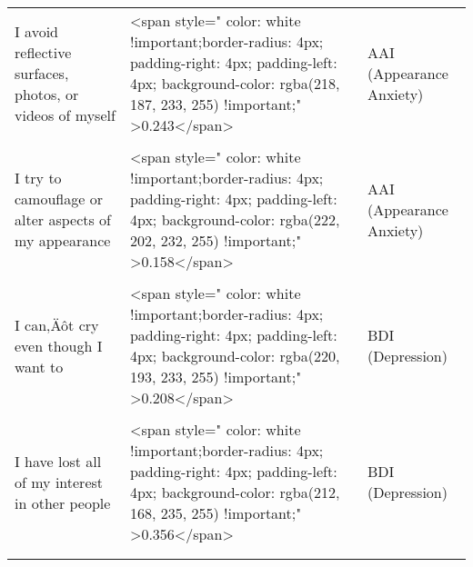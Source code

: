 \documentclass[border=1mm]{standalone}
\begin{document}
\begin{longtable}{lll}
I avoid reflective surfaces, photos, or videos of myself & <span style="     color: white !important;border-radius: 4px; padding-right: 4px; padding-left: 4px; background-color: rgba(218, 187, 233, 255) !important;" >0.243</span> & AAI (Appearance Anxiety)\\
\cellcolor{gray!10}{I discuss my appearance with others or question them about it} & \cellcolor{gray!10}{<span style="     color: white !important;border-radius: 4px; padding-right: 4px; padding-left: 4px; background-color: rgba(229, 228, 229, 255) !important;" >0.007</span>} & \cellcolor{gray!10}{AAI (Appearance Anxiety)}\\
I try to camouflage or alter aspects of my appearance & <span style="     color: white !important;border-radius: 4px; padding-right: 4px; padding-left: 4px; background-color: rgba(222, 202, 232, 255) !important;" >0.158</span> & AAI (Appearance Anxiety)\\
\addlinespace
\cellcolor{gray!10}{I do not feel sad / I am so sad or unhappy that I can‚Äôt stand it} & \cellcolor{gray!10}{<span style="     color: white !important;border-radius: 4px; padding-right: 4px; padding-left: 4px; background-color: rgba(223, 204, 232, 255) !important;" >0.146</span>} & \cellcolor{gray!10}{BDI (Depression)}\\
I can‚Äôt cry even though I want to & <span style="     color: white !important;border-radius: 4px; padding-right: 4px; padding-left: 4px; background-color: rgba(220, 193, 233, 255) !important;" >0.208</span> & BDI (Depression)\\
\cellcolor{gray!10}{I don‚Äôt get irritated at all by the things that used to irritate me} & \cellcolor{gray!10}{<span style="     color: white !important;border-radius: 4px; padding-right: 4px; padding-left: 4px; background-color: rgba(225, 214, 231, 255) !important;" >0.086</span>} & \cellcolor{gray!10}{BDI (Depression)}\\
I have lost all of my interest in other people & <span style="     color: white !important;border-radius: 4px; padding-right: 4px; padding-left: 4px; background-color: rgba(212, 168, 235, 255) !important;" >0.356</span> & BDI (Depression)\\
\cellcolor{gray!10}{I can‚Äôt make decisions at all anymore} & \cellcolor{gray!10}{<span style="     color: white !important;border-radius: 4px; padding-right: 4px; padding-left: 4px; background-color: rgba(220, 195, 233, 255) !important;" >0.2</span>} & \cellcolor{gray!10}{BDI (Depression)}\\
\addlinespace

\end{longtable}
\end{document}
